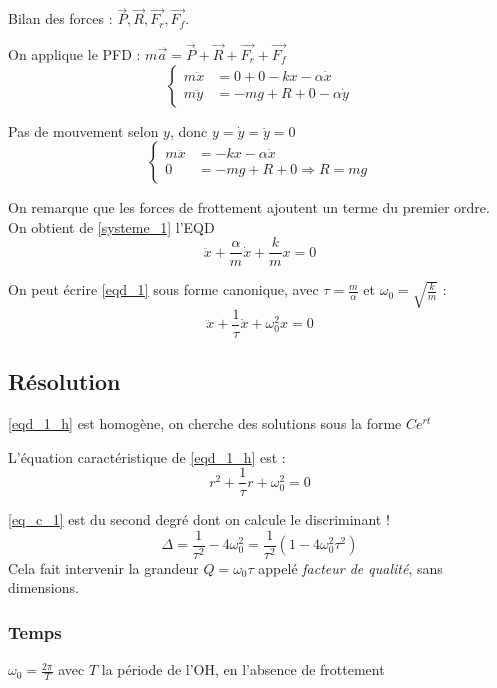 \documentclass[french]{yLectureNote}
\renewcommand{\vec}{\overrightarrow}
\begin{document}
Bilan des forces : $\vec{P},\vec{R},\vec{F_r},\vec{F_f}$.

On applique le PFD : $m\vec{a} = \vec{P}+\vec{R}+\vec{F_r}+\vec{F_f}$
\[\left\{\begin{matrix}
 m\ddot{x} &= 0 + 0 -kx -\alpha \dot{x}\\
 m\ddot{y} &= -mg+R + 0 -\alpha\dot{y}
\end{matrix}\right.\]

Pas de mouvement selon $y$, donc $y=\dot{y} = \ddot{y} = 0$
\begin{equation}\left\{\begin{matrix}
 m\ddot{x} &=-kx -\alpha \dot{x}\\
0 &= -mg+R + 0 \Rightarrow R = mg
\end{matrix}\right.\label{systeme_1}\end{equation}

On remarque que les forces de frottement ajoutent un terme du premier ordre. On obtient de \eqref{systeme_1} l'EQD
\begin{equation}\ddot{x} + \frac{\alpha}{m}\dot{x} + \frac{k}{m}x = 0\label{eqd_1}\end{equation}

On peut écrire \eqref{eqd_1} sous forme canonique, avec $\tau = \frac{m}{\alpha}$ et $\omega_0 = \sqrt{\frac{k}{m}}$ :
\begin{equation}\ddot{x} + \frac{1}{\tau}\dot{x} + \omega_0^2x = 0\label{eqd_1_h}\end{equation}

\subsection{Résolution}
\eqref{eqd_1_h} est homogène, on cherche des solutions sous la forme $Ce^{rt}$

L'équation caractéristique de \eqref{eqd_1_h} est : \begin{equation}r^2 + \frac{1}{\tau}r + \omega_0^2 = 0\label{eq_c_1}\end{equation}

\eqref{eq_c_1} est du second degré dont on calcule le discriminant ! \begin{equation}\Delta = \frac{1}{\tau^2} - 4\omega_0^2 = \frac{1}{\tau^2}(1-4\omega_0^2\tau^2)\label{delta}\end{equation} Cela fait intervenir la grandeur $Q = \omega_0\tau$ appelé \emph{facteur de qualité}, sans dimensions.
\subsubsection{Temps}
$\omega_0 = \frac{2\pi}{T}$ avec $T$ la période de l'OH, en l'absence de frottement
\end{document}
